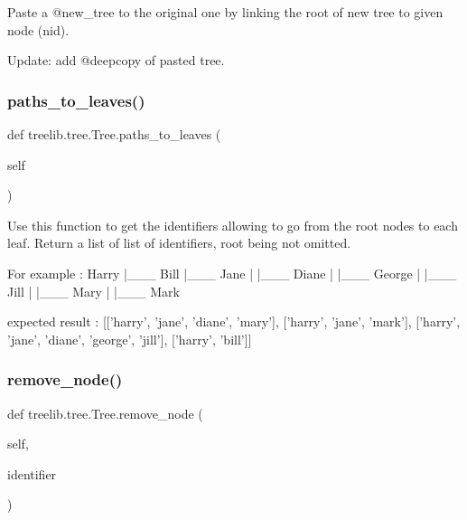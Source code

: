 \begin{DoxyVerb}Paste a @new_tree to the original one by linking the root
of new tree to given node (nid).

Update: add @deepcopy of pasted tree.
\end{DoxyVerb}
 \mbox{\label{classtreelib_1_1tree_1_1Tree_a775b014905a41f6e2b17f80fdfcdb294}} 
\subsubsection{\texorpdfstring{paths\+\_\+to\+\_\+leaves()}{paths\_to\_leaves()}}
{\footnotesize\ttfamily def treelib.\+tree.\+Tree.\+paths\+\_\+to\+\_\+leaves (\begin{DoxyParamCaption}\item[{}]{self }\end{DoxyParamCaption})}

\begin{DoxyVerb}Use this function to get the identifiers allowing to go from the root
nodes to each leaf.
Return a list of list of identifiers, root being not omitted.

For example :
    Harry
    |___ Bill
    |___ Jane
    |    |___ Diane
    |         |___ George
    |              |___ Jill
    |         |___ Mary
    |    |___ Mark

expected result :
[['harry', 'jane', 'diane', 'mary'],
 ['harry', 'jane', 'mark'],
 ['harry', 'jane', 'diane', 'george', 'jill'],
 ['harry', 'bill']]
\end{DoxyVerb}
 \mbox{\label{classtreelib_1_1tree_1_1Tree_aed9ee0821e87c9864e43e075c076f967}} 
\subsubsection{\texorpdfstring{remove\+\_\+node()}{remove\_node()}}
{\footnotesize\ttfamily def treelib.\+tree.\+Tree.\+remove\+\_\+node (\begin{DoxyParamCaption}\item[{}]{self,  }\item[{}]{identifier }\end{DoxyParamCaption})}

